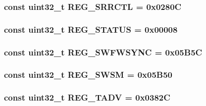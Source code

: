 \label{namespaceiGbReg_a03190c72ce8dd147689b7e671fbb3e70}
\hypertarget{namespaceiGbReg_ab0639bae5d2694cf8a8f9aaaba9d4977}{
\subsubsection[{REG\_\-SRRCTL}]{\setlength{\rightskip}{0pt plus 5cm}const {\bf uint32\_\-t} {\bf REG\_\-SRRCTL} = 0x0280C}}
\label{namespaceiGbReg_ab0639bae5d2694cf8a8f9aaaba9d4977}
\hypertarget{namespaceiGbReg_ac1d1c17e03a8c10f26a1f4a2b2f2e8db}{
\subsubsection[{REG\_\-STATUS}]{\setlength{\rightskip}{0pt plus 5cm}const {\bf uint32\_\-t} {\bf REG\_\-STATUS} = 0x00008}}
\label{namespaceiGbReg_ac1d1c17e03a8c10f26a1f4a2b2f2e8db}
\hypertarget{namespaceiGbReg_a4ee74c9ae8abd7bb42d2d7c6a5d4ed1f}{
\subsubsection[{REG\_\-SWFWSYNC}]{\setlength{\rightskip}{0pt plus 5cm}const {\bf uint32\_\-t} {\bf REG\_\-SWFWSYNC} = 0x05B5C}}
\label{namespaceiGbReg_a4ee74c9ae8abd7bb42d2d7c6a5d4ed1f}
\hypertarget{namespaceiGbReg_a8ebb03ad73bb087733a50473e2aa812f}{
\subsubsection[{REG\_\-SWSM}]{\setlength{\rightskip}{0pt plus 5cm}const {\bf uint32\_\-t} {\bf REG\_\-SWSM} = 0x05B50}}
\label{namespaceiGbReg_a8ebb03ad73bb087733a50473e2aa812f}
\hypertarget{namespaceiGbReg_abebfa86c43f0b0a894e7bedc2f329b59}{
\subsubsection[{REG\_\-TADV}]{\setlength{\rightskip}{0pt plus 5cm}const {\bf uint32\_\-t} {\bf REG\_\-TADV} = 0x0382C}}
\label{namespaceiGbReg_abebfa86c43f0b0a894e7bedc2f329b59}
